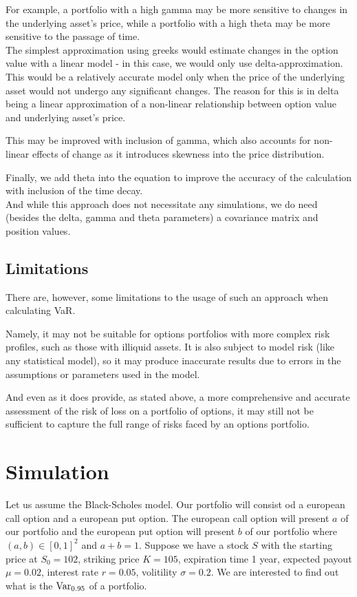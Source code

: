 \documentclass[a4paper, 12pt]{article}
\theoremstyle{definition}
\theoremstyle{plain}
\theoremstyle{definition}
\begin{document}
For example, 
a portfolio with a high gamma may be 
more sensitive to changes in the 
underlying asset's price, 
while a portfolio with a high theta 
may be more sensitive to the passage 
of time.\\


The simplest approximation using greeks would estimate changes 
in the option value with a linear model - in this case, we would 
only use delta-approximation. This would be a relatively accurate 
model only when the price of the underlying asset would not undergo any 
significant changes. The reason for this is in delta being a linear 
approximation of a non-linear relationship between option value and underlying 
asset's price. 

This may be improved with inclusion of gamma, which also accounts for 
non-linear effects of change as it introduces skewness into the price distribution.


Finally, we add theta into the equation to improve the accuracy of the calculation 
with inclusion of the time decay.\\

And while this approach does not necessitate any simulations,
we do need (besides the delta, gamma and theta 
parameters) a covariance matrix and position values. 



\subsection{Limitations}

There are, however, some limitations to the usage of such an approach
when calculating VaR. 

Namely, it may not be suitable for options portfolios with more complex 
risk profiles, such as those with illiquid assets. 
It is also subject to model risk (like any statistical model),
so it may produce inaccurate results due to errors in the 
assumptions or parameters used in the model.

And even as it does provide, as stated above, 
a more comprehensive and accurate assessment of the risk 
of loss on a portfolio of options, it may still not be 
sufficient to capture the full range of risks faced by 
an options portfolio.

\section{Simulation}

Let us assume the Black-Scholes model.
Our portfolio will consist od a european 
call option and a european put option.
The european call option will present 
$a$ of our portfolio and the  european put option
will present $b$ of our portfolio 
where $(a,b) \in [0,1]^2$ and $a+b=1$.
Suppose we have a stock $S$ with the starting price 
at $S_0 = 102$, striking price $K=105$, expiration time 
1 year, expected payout $\mu = 0.02$, interest rate
$r = 0.05$, volitility $\sigma = 0.2$.
We are interested to find out what is the 
$\textnormal{Var}_{0.95}$ of a portfolio.
\end{document}
